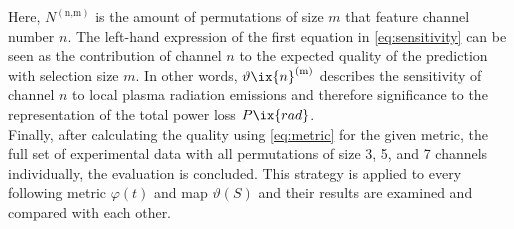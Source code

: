 %
            Here, $N^{\left(\text{n,m}\right)}$ is the amount of permutations of size $m$ that feature channel number $n$. The left-hand expression of the first equation in \cref{eq:sensitivity} can be seen as the contribution of channel $n$ to the expected quality of the prediction with selection size $m$. In other words, $\vartheta\ix{n}^{\left(\text{m}\right)}$ describes the sensitivity of channel $n$ to local plasma radiation emissions and therefore significance to the representation of the total power loss $P\ix{rad}$.\\%
            Finally, after calculating the quality using \cref{eq:metric} for the given metric, the full set of experimental data with all permutations of size 3, 5, and 7 channels individually, the evaluation is concluded. This strategy is applied to every following metric $\varphi\left(t\right)$ and map $\vartheta\left(S\right)$ and their results are examined and compared with each other.%
%
